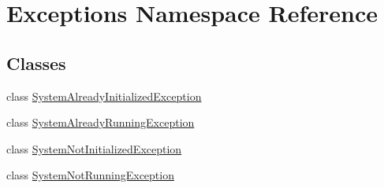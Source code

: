 \hypertarget{namespace_exceptions}{}\section{Exceptions Namespace Reference}
\label{namespace_exceptions}
\subsection*{Classes}
\begin{DoxyCompactItemize}
\item 
class \hyperlink{class_exceptions_1_1_system_already_initialized_exception}{System\+Already\+Initialized\+Exception}
\item 
class \hyperlink{class_exceptions_1_1_system_already_running_exception}{System\+Already\+Running\+Exception}
\item 
class \hyperlink{class_exceptions_1_1_system_not_initialized_exception}{System\+Not\+Initialized\+Exception}
\item 
class \hyperlink{class_exceptions_1_1_system_not_running_exception}{System\+Not\+Running\+Exception}
\end{DoxyCompactItemize}
